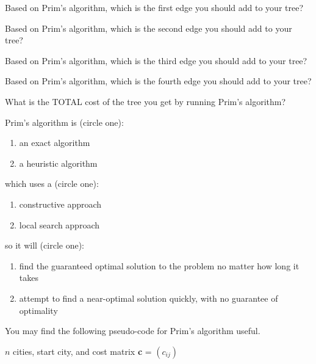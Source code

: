 \begin{parts}
 Based on Prim's algorithm, which is the first edge you should add to your tree?

\vfill

  Based on Prim's algorithm, which is the second edge you should add to your tree?
\vfill

  Based on Prim's algorithm, which is the third edge you should add to your tree?

\vfill

  Based on Prim's algorithm, which is the fourth edge you should add to your tree?

\vfill

 What is the TOTAL cost of the tree you get by running Prim's algorithm?

\newpage

   Prim's algorithm is (circle one):  
\begin{enumerate}
\item an exact algorithm
\item a heuristic algorithm
\end{enumerate} 
which uses a (circle one):
\begin{enumerate}
\item constructive approach
\item local search approach
\end{enumerate}
so it will (circle one):
\begin{enumerate}
\item find the guaranteed optimal solution to the problem no matter how long it takes
\item attempt to find a near-optimal solution quickly, with no guarantee of optimality
\end{enumerate}


 \vspace{2cm}

You may find the following pseudo-code for Prim's algorithm useful. 
\vspace{0.5cm}
	
  $n$ cities, start city, and cost matrix {\bf c} = $(c_{ij})$ \medskip 
	

\end{parts}
